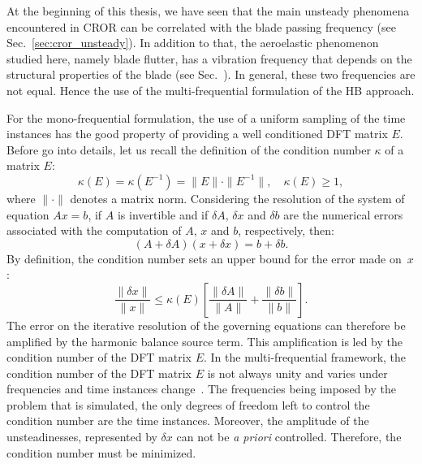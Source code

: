 
At the beginning of this thesis, we have seen that the main unsteady
phenomena encountered in CROR can be correlated with the blade passing
frequency (see Sec.~\ref{sec:cror_unsteady}).
In addition to that, the aeroelastic phenomenon
studied here, namely blade flutter, has a vibration frequency that
depends on the structural properties of the blade (see Sec.~). 
In general, these two
frequencies are not equal. Hence the use of the
multi-frequential formulation of the HB approach. 


For the mono-frequential formulation, the use of a uniform
sampling of the time instances has the good property of providing
a well conditioned DFT matrix $E$.
Before go into details, let us recall the definition of the
condition number $\kappa$ of a matrix $E$:
\begin{equation}
  \kappa (E) = \kappa (E^{-1}) = \| E \| \cdot \| E^{-1} \|, \quad
    \kappa(E) \geq 1,
\end{equation}
where $\| \cdot \|$ denotes a matrix norm. Considering the resolution
of the system of equation
$A x = b$, if $A$ is invertible and if $\delta A$, $\delta x$ and
$\delta b$ are the numerical errors associated with the computation of
$A$, $x$ and $b$, respectively, then:
\begin{equation}
   (A + \delta A)(x + \delta x) = b + \delta b.
   \label{eq:error_reso}
\end{equation}
By definition, the condition number sets an upper bound for 
the error made on~$x$:
\begin{equation}
   \frac{\| \delta x \|}{\| x \|} \leq 
   \kappa(E)\left[\frac{\| \delta A \|}{\| A \|} + 
   \frac{\| \delta b \|}{\| b \|} \right].
   \label{eq:conditonnig_amp}
\end{equation}
The error on the iterative resolution of the governing equations can
therefore be amplified by the harmonic balance source term.
This amplification is
led by the condition number of the DFT matrix $E$. 
In the multi-frequential framework,
the condition number of the DFT matrix $E$ is not always unity and
varies under frequencies and time instances change~\cite{Kundert1988}. 
The frequencies
being imposed by the problem that is simulated,
the only degrees of freedom left to control the condition
number are the time instances. 
Moreover, the amplitude of the unsteadinesses, represented by $\delta x$
can not be \emph{a priori} controlled. Therefore, the condition
number must be minimized.

